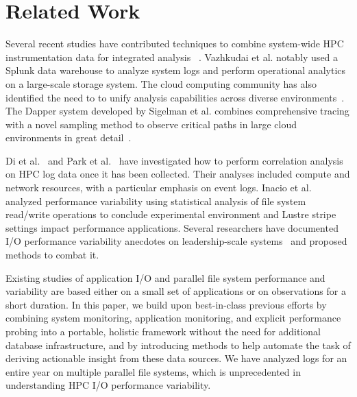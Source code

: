 \section{Related Work}

Several recent studies have contributed techniques to combine
system-wide HPC instrumentation data for integrated
analysis~\cite{Lockwood2017,Vazhkudai2017guide,Agelastos2014ldms,Kunkel2014siox,RIOT_2013}
. Vazhkudai et al. notably used a Splunk data warehouse to analyze system
logs and perform operational analytics on a large-scale storage system.
The cloud computing community has also identified the need to to unify
analysis capabilities across diverse environments~\cite{Vazhkudai2017guide}. The Dapper system
developed by Sigelman et al. combines comprehensive tracing with a novel
sampling method to observe critical paths in large cloud environments in great
detail~\cite{Sigelman2010dapper}.

Di et al.~\cite{7973730} and Park et al.~\cite{Park2017BigDM} have
investigated how to perform correlation analysis on HPC log data once it has been
collected.  Their analyses included compute and network resources, with a
particular emphasis on event logs. Inacio et al. analyzed performance variability using statistical analysis of file system read/write operations to conclude experimental environment and Lustre stripe settings impact performance applications. 
Several researchers have documented 
I/O performance variability anecdotes on leadership-scale
systems~\cite{Lofstead2010,Yildiz2016,carns2011understanding} and proposed
methods to combat it.  

Existing studies of application I/O and parallel file system performance and variability are based either on a small set of applications or on observations for a short duration. In this paper, we 
 build upon best-in-class previous efforts by combining system
monitoring, application monitoring, and explicit performance probing
into a portable, holistic framework without the need for additional database
infrastructure, and by introducing methods to help automate the task
of deriving actionable insight from these data sources. We have analyzed logs for an entire year on multiple parallel file systems, which is unprecedented in understanding HPC I/O performance variability.
